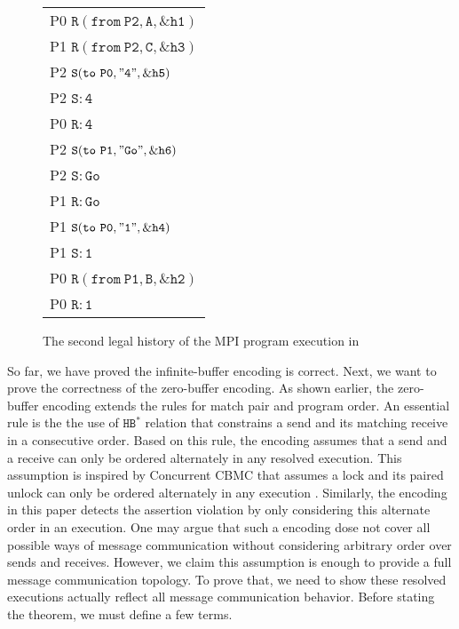 \begin{figure}[h2]
\begin{center}
\setlength{\tabcolsep}{2pt}
\small \begin{tabular}[t]{l}
P0 $\mathtt{R(from\ P2, A, \&h1)}$ \\
P1 $\mathtt{R(from\ P2, C, \&h3)}$ \\
P2 $\mathtt{S(to\ P0, "4", \&h5)}$ \\
P2 $\mathtt{S: 4}$\\
P0 $\mathtt{R: 4}$ \\
P2 $\mathtt{S(to\ P1, "Go", \&h6)}$ \\
P2 $\mathtt{S: Go}$ \\
P1 $\mathtt{R: Go}$ \\
P1 $\mathtt{S(to\ P0, "1", \&h4)}$ \\
P1 $\mathtt{S: 1}$ \\
P0 $\mathtt{R(from\ P1, B, \&h2)}$ \\
P0 $\mathtt{R: 1}$ \\
\end{tabular}
\end{center}
\caption{The second legal history of the MPI program execution in }
\label{fig:history}
\end{figure}

So far, we have proved the infinite-buffer encoding is correct. Next, we want to prove the correctness of the zero-buffer encoding. As shown earlier, the zero-buffer encoding extends the rules for match pair and program order. An essential rule is the the use of $\mathtt{HB^*}$ relation that constrains a send and its matching receive in a consecutive order. Based on this rule, the encoding assumes that a send and a receive can only be ordered alternately in any resolved execution. This assumption is inspired by Concurrent CBMC that assumes a lock and its paired unlock can only be ordered alternately in any execution \cite{DBLP:conf/cav/RabinovitzG05}. Similarly, the encoding in this paper detects the assertion violation by only considering this alternate order in an execution. One may argue that such a encoding dose not cover all possible ways of message communication without considering arbitrary order over sends and receives. However, we claim this assumption is enough to provide a full message communication topology. To prove that, we need to show these resolved executions actually reflect all message communication behavior. Before stating the theorem, we must define a few terms.

